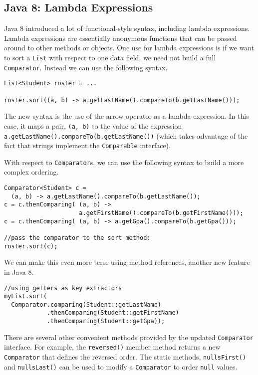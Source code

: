 \subsection{Java 8: Lambda Expressions}

Java 8 introduced a lot of functional-style syntax, including 
\glspl{lambda expression}.  Lambda expressions are essentially anonymous
functions that can be passed around to other methods or objects.
One use for lambda expressions is if we want to sort a \texttt{List}
with respect to one data field, we need not build a full 
\texttt{Comparator}.  Instead we can use the following syntax.

\begin{verbatim}
List<Student> roster = ...

roster.sort((a, b) -> a.getLastName().compareTo(b.getLastName()));
\end{verbatim}

The new syntax is the use of the arrow operator as a lambda 
expression.  In this case, it maps a pair, \texttt{(a, b)}
to the value of the expression 
\texttt{a.getLastName().compareTo(b.getLastName())}
(which takes advantage of the fact that strings implement the 
\texttt{Comparable} interface). 

With respect to \texttt{Comparator}s, we can use the following 
syntax to build a more complex ordering.

\begin{verbatim}
Comparator<Student> c = 
  (a, b) -> a.getLastName().compareTo(b.getLastName());
c = c.thenComparing( (a, b) -> 
                     a.getFirstName().compareTo(b.getFirstName()));
c = c.thenComparing( (a, b) -> a.getGpa().compareTo(b.getGpa()));

//pass the comparator to the sort method:
roster.sort(c);
\end{verbatim}

We can make this even more terse using method references, another
new feature in Java 8.

\begin{verbatim}
//using getters as key extractors 
myList.sort(
  Comparator.comparing(Student::getLastName)
            .thenComparing(Student::getFirstName)
            .thenComparing(Student::getGpa));
\end{verbatim}

There are several other convenient methods provided by the updated
\texttt{Comparator} interface.  For example, 
the \texttt{reversed()} member method returns a new
\texttt{Comparator} that defines the reversed order.
The static methods, \texttt{nullsFirst()} and 
\texttt{nullsLast()} can be used to modify a 
\texttt{Comparator} to order \texttt{null}
values.
